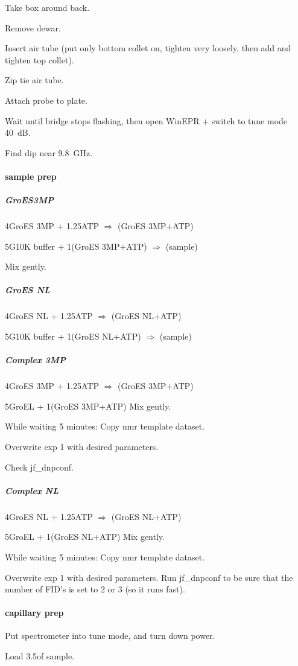 Take box around back.

Remove dewar.

Insert air tube (put only bottom collet on, tighten very loosely, then add and tighten top collet).

Zip tie air tube.

Attach probe to plate.

Wait until bridge stops flashing, then open WinEPR + switch to tune mode 40~dB.

Find dip near 9.8~GHz.

\paragraph{sample prep}
\subparagraph{GroES3MP}
4\uL GroES 3MP + 1.25\M ATP $\Rightarrow$ (GroES 3MP+ATP)

5\uL G10K buffer + 1\uL (GroES 3MP+ATP) $\Rightarrow$ (sample)

Mix gently.

\subparagraph{GroES NL}
4\uL GroES NL + 1.25\M ATP $\Rightarrow$ (GroES NL+ATP)

5\uL G10K buffer + 1\uL (GroES NL+ATP) $\Rightarrow$ (sample)

\subparagraph{Complex 3MP}
4\uL GroES 3MP + 1.25\M ATP $\Rightarrow$ (GroES 3MP+ATP)

5\uL GroEL + 1\uL (GroES 3MP+ATP)
Mix gently.

While waiting 5 minutes:
Copy nmr template dataset.

Overwrite exp 1 with desired parameters.

Check jf\_dnpconf.

\subparagraph{Complex NL}
4\uL GroES NL + 1.25\M ATP $\Rightarrow$ (GroES NL+ATP)

5\uL GroEL + 1\uL (GroES NL+ATP)
Mix gently.

While waiting 5 minutes:
Copy nmr template dataset.

Overwrite exp 1 with desired parameters.
Run jf\_dnpconf to be sure that the number of FID's is set to 2 or 3 (so it runs fast).

\paragraph{capillary prep}
Put spectrometer into tune mode, and turn down power.

Load 3.5\uL of sample.

